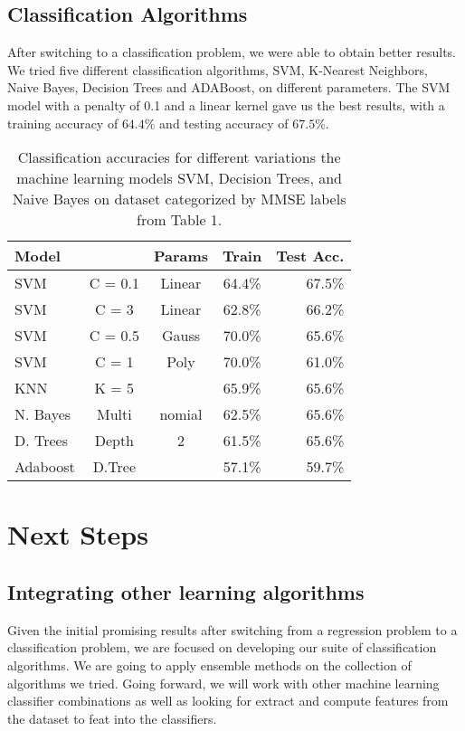 \documentclass{article}
\begin{document}
\subsection{Classification Algorithms}
After switching to a classification problem, we were able to obtain better results. We tried five different classification algorithms, SVM, K-Nearest Neighbors, Naive Bayes, Decision Trees and ADABoost, on different parameters. The SVM  model with a penalty of 0.1 and a linear kernel gave us the best results, with a training accuracy of $64.4\%$ and testing accuracy of $67.5\%$. 
\begin{table}[h]
\caption{Classification accuracies for different variations the machine learning models SVM, Decision Trees, and Naive Bayes on dataset categorized by MMSE labels from Table 1.}
\label{sample-table}
\vskip 0.15in
\begin{center}
\begin{small}
\begin{sc}
\begin{tabular}{lcccr}
\hline
\abovespace\belowspace
Model & & Params & Train & Test Acc. \\
\hline
\abovespace
SVM    & C = 0.1 & Linear & 64.4\% & 67.5\% \\
SVM    & C = 3 & Linear & 62.8\% & 66.2\% \\
SVM    & C = 0.5 & Gauss & 70.0\% & 65.6\% \\
SVM    & C = 1 & Poly & 70.0\% & 61.0\% \\
KNN    & K = 5 && 65.9\% & 65.6\% \\
N. Bayes    &Multi & nomial & 62.5\% & 65.6\% \\
D. Trees    &Depth & 2 & 61.5\% & 65.6\% \\
\belowspace
Adaboost    & D.Tree  &  & 57.1\% & 59.7\% \\
\hline
\end{tabular}
\end{sc}
\end{small}
\end{center}
\vskip -0.1in
\end{table}
\section{Next Steps}
\subsection{Integrating other learning algorithms}
Given the initial promising results after switching from a regression problem to a classification problem, we are focused on developing our suite of classification algorithms. We are going to apply ensemble methods on the collection of algorithms we tried. Going forward, we will work with other machine learning classifier combinations as well as looking for extract and compute features from the dataset to feat into the classifiers.
\end{document}
